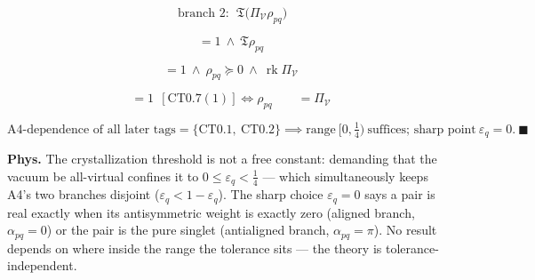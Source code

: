 \begin{theorem}
\[
\ \text{branch 2}:\ \ \mathfrak T\bigl(\Pi_{\mathcal V}\rho_{pq}\bigr)
\]

\[
= 1\ \wedge\ \mathfrak T\rho_{pq}
\]

\[
= 1\ \wedge\ \rho_{pq}\succeq0\ \wedge\ \operatorname{rk}\Pi_{\mathcal V}
\]

\[
= 1\ \ [\mathrm{CT0.7}(1)]\iff\rho_{pq}\qquad = \Pi_{\mathcal V}
\]

\[
\text{A4-dependence of all later tags}=\{\mathrm{CT0.1},\ \mathrm{CT0.2}\}\implies\text{range}\ [0,\tfrac14)\ \text{suffices; sharp point}\ \varepsilon_q=0.\ \blacksquare
\]

\textbf{Phys.} The crystallization threshold is not a free constant: demanding that the vacuum be all-virtual confines it to $0\le\varepsilon_q<\tfrac14$ — which simultaneously keeps A4's two branches disjoint ($\varepsilon_q<1-\varepsilon_q$). The sharp choice $\varepsilon_q=0$ says a pair is real exactly when its antisymmetric weight is exactly zero (aligned branch, $\alpha_{pq}=0$) or the pair is the pure singlet (antialigned branch, $\alpha_{pq}=\pi$). No result depends on where inside the range the tolerance sits — the theory is tolerance-independent.

\end{theorem}

